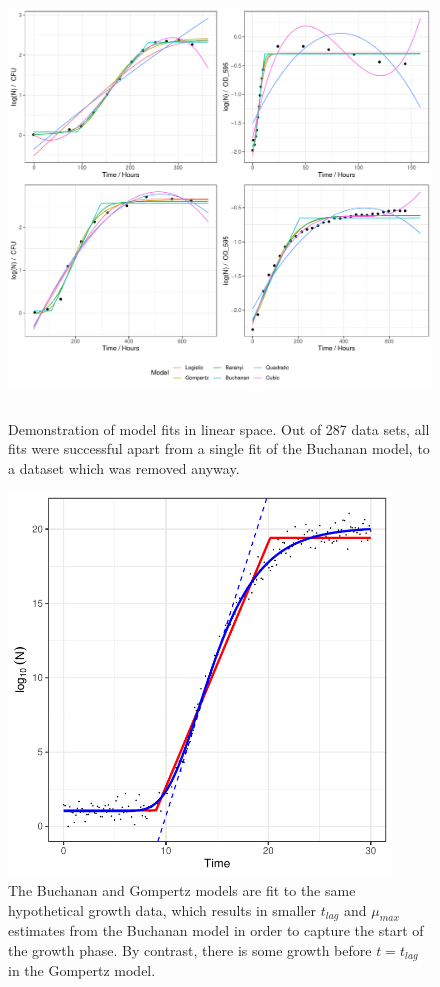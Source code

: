 \documentclass[11pt, a4paper]{article}
\begin{document}
                \begin{figure}[H]
                \centering
        \includegraphics[height=4.5in]{../results/model_fits_linear.pdf}
        \caption{Demonstration of model fits in linear space. Out of 287 data sets, all fits were successful apart from a single fit of the Buchanan model, to a dataset which was removed anyway.}
        \label{sup:model_fits_linear}
        \end{figure}

         \begin{figure}[H]
        \includegraphics[width=4in]{../results/fit_difference.pdf}
        \centering
        \caption{The Buchanan and Gompertz models are fit to the same hypothetical growth data, which results in smaller $t_{lag}$ and $\mu_{max}$ estimates from the Buchanan model in order to capture the start of the growth phase. By contrast, there is some growth before $t = t_{lag}$ in the Gompertz model.}
        \label{sup:fit_difference}
        \end{figure} 
        
\end{document}
